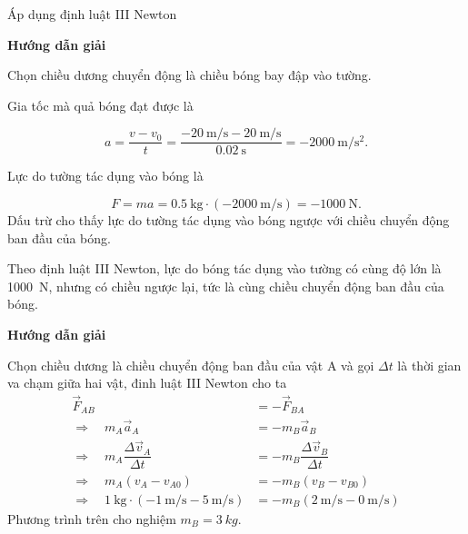 \begin{dang}{Áp dụng định luật III Newton}
	{	\begin{center}
			\textbf{Hướng dẫn giải}
		\end{center}
		
		Chọn chiều dương chuyển động là chiều bóng bay đập vào tường.
		
		Gia tốc mà quả bóng đạt được là
		
		$$a = \dfrac{v-v_0}{t}=\dfrac{-\SI{20}{\meter/\second}-\SI{20}{\meter/\second}}{\SI{0.02}{\second}} = -\SI{2000}{\meter/\second^2}.$$
		
		Lực do tường tác dụng vào bóng là
		
		$$F =ma =\SI{0.5}{\kilogram}\cdot(\SI{-2000}{\meter/\second})= -\SI{1000}{\newton}.$$
		Dấu trừ cho thấy lực do tường tác dụng vào bóng ngược với chiều chuyển động ban đầu của bóng. 
		
		Theo định luật III Newton, lực do bóng tác dụng vào tường có cùng độ lớn là \SI{1000}{\newton}, nhưng có chiều ngược lại, tức là cùng chiều chuyển động ban đầu của bóng.	
	}
	{	\begin{center}
			\textbf{Hướng dẫn giải}
		\end{center}
		
		Chọn chiều dương là chiều chuyển động ban đầu của vật A và gọi $\Delta t$ là thời gian va chạm giữa hai vật, đinh luật III Newton cho ta
		\begin{align*}
			\vec{F}_{AB}&=-\vec{F}_{BA}\\
			\Rightarrow\quad m_A\vec{a}_A&=-m_B\vec{a}_B\\
			\Rightarrow\quad m_A\dfrac{\Delta \vec{v}_A}{\Delta t}&=-m_B\dfrac{\Delta\vec{v}_B}{\Delta t}\\	
			\Rightarrow\quad m_A(v_A-v_{A0})&=-m_B(v_B-v_{B0})\\
			\Rightarrow\quad \SI{1}{\kilogram}\cdot(\SI{-1}{\meter/\second}-\SI{5}{\meter/\second})&=-m_B(\SI{2}{\meter/\second}-\SI{0}{\meter/\second})		
		\end{align*}
		Phương trình trên cho nghiệm $m_B = \SI{3}{kg}.$
		
	}
	
\end{dang}